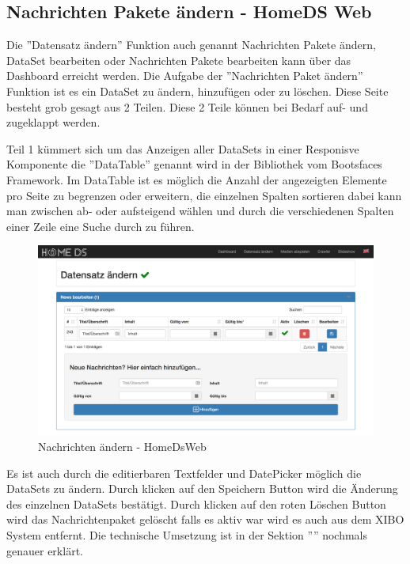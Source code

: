 \subsection{Nachrichten Pakete ändern - HomeDS Web}\label{sec:homedswebdataset}
Die ''Datensatz ändern'' Funktion auch genannt Nachrichten Pakete ändern, DataSet bearbeiten oder Nachrichten Pakete bearbeiten kann über das Dashboard erreicht werden.
Die Aufgabe der ''Nachrichten Paket ändern'' Funktion ist es ein DataSet zu ändern, hinzufügen oder zu löschen. Diese Seite besteht grob gesagt aus 2 Teilen. Diese 2 Teile können bei Bedarf auf- und zugeklappt werden.

Teil 1 kümmert sich um das Anzeigen aller DataSets in einer Responisve Komponente die ''DataTable'' genannt wird in der Bibliothek vom Bootsfaces Framework. Im DataTable ist es möglich die Anzahl der angezeigten Elemente pro Seite zu begrenzen oder erweitern,  die einzelnen Spalten sortieren dabei kann man zwischen ab- oder aufsteigend wählen und durch die verschiedenen Spalten einer Zeile eine Suche durch zu führen. 


\begin{figure}[H]
\centering
\includegraphics[width=1\textwidth]{images/08_HomeDsWeb/NachrichtenPaket.png}
\caption{Nachrichten ändern - HomeDsWeb}
\label{img:changenews}
\end{figure}


Es ist auch durch die editierbaren Textfelder und DatePicker möglich die DataSets zu ändern. Durch klicken auf den Speichern Button wird die Änderung des einzelnen DataSets bestätigt. Durch klicken auf den roten Löschen Button wird das Nachrichtenpaket gelöscht falls es aktiv war wird es auch aus dem XIBO System entfernt. Die technische Umsetzung ist in der Sektion '''' nochmals genauer erklärt. 

